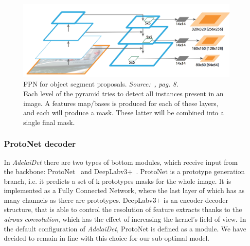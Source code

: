 \documentclass[10pt,twocolumn,letterpaper]{article}
\begin{document}
\begin{figure}[H]
\centering
  \includegraphics[width=0.8\linewidth]{./image/FPN.png} 
  \caption{FPN for object segment proposals. \textit{Source:~\cite{FPN}, pag. 8.}\\
Each level of the pyramid tries to detect all instances present in an image. A features map/bases is produced for each of these layers, and each will produce a mask. These latter will be combined into a single final mask.}%
  \label{fig:FPN}
\noindent
\end{figure}


\subsubsection{ProtoNet decoder}
In \textit{AdelaiDet} there are two types of bottom modules, which receive input from the backbone: ProtoNet~\cite{protonet} and DeepLabv3$+$~\cite{deeplab}. ProtoNet is a prototype generation branch, i.e. it predicts a set of k prototypes masks for the whole image. It is implemented as a Fully Connected Network, where the last layer of which has as many channels as there are prototypes. DeepLabv3$+$ is an encoder-decoder structure, that is able to control the resolution of feature extracts thanks to the \textit{atrous convolution}, which has the effect of increasing the kernel's field of view. In the default configuration of \textit{AdelaiDet}, ProtoNet is defined as a module. We have decided to remain in line with this choice for our sub-optimal model.
\end{document}
